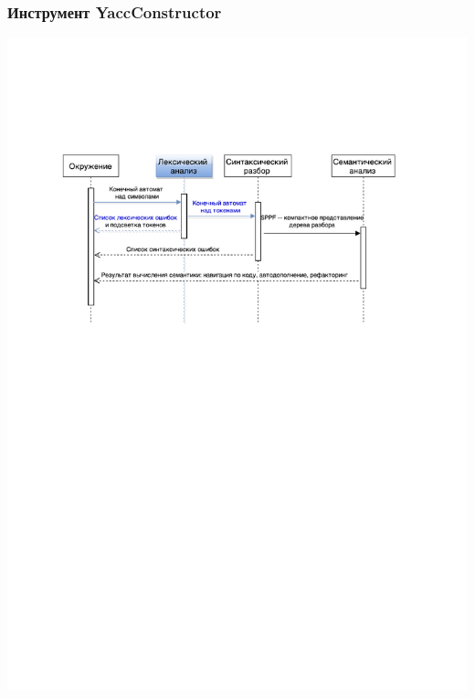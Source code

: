 \documentclass{beamer}
\begin{document}
\begin{frame}
\transwipe[direction=90]
\frametitle{Инструмент YaccConstructor}
\begin{center}
	{\includegraphics[width=1.0\linewidth]{Seq_with_lexer_highlighted_rus}}
\end{center}
\end{frame}
\end{document}
